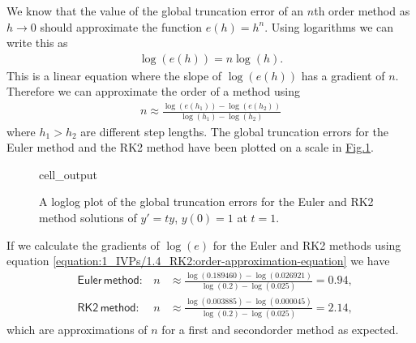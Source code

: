 \documentclass[letterpaper,10pt,english]{jupyterBook}
\begin{document}
\sphinxAtStartPar
We know that the value of the global truncation error of an \(n\)th order method as \(h \to 0\) should approximate the function \(e(h) = h^n\). Using logarithms we can write this as
\begin{equation*}
\begin{split}\log(e(h)) = n \log(h).\end{split}
\end{equation*}
\sphinxAtStartPar
This is a linear equation where the slope of \(\log(e(h))\) has a gradient of \(n\). Therefore we can approximate the order of a method using
\begin{equation}\label{equation:1_IVPs/1.4_RK2:order-approximation-equation}
\begin{split}n \approx \frac{\log(e(h_1)) - \log(e(h_2))}{\log(h_1) - \log(h_2)}\end{split}
\end{equation}
\sphinxAtStartPar
where \(h_1 > h_2\) are different step lengths. The global truncation errors for the Euler method and the RK2 method have been plotted on a  scale in \hyperref[\detokenize{1_IVPs/1.4_RK2:rk2-euler-gte-loglog-plot-figure}]{Fig.\@ \ref{\detokenize{1_IVPs/1.4_RK2:rk2-euler-gte-loglog-plot-figure}}}.

\begin{figure}[htbp]
\centering
\capstart
\begin{sphinxVerbatimOutput}

\begin{sphinxuseclass}{cell_output}
\noindent{}

\end{sphinxuseclass}\end{sphinxVerbatimOutput}
\caption{A loglog plot of the global truncation errors for the Euler and RK2 method solutions of \(y' = t y\), \(y(0) = 1\) at \(t = 1\).}\label{\detokenize{1_IVPs/1.4_RK2:rk2-euler-gte-loglog-plot-figure}}\end{figure}

\sphinxAtStartPar
If we calculate the gradients of \(\log(e)\) for the Euler and RK2 methods using equation \eqref{equation:1_IVPs/1.4_RK2:order-approximation-equation} we have
\begin{align*}
    &\mathsf{Euler\, method}: & n &\approx \frac{\log(0.189460) - \log(0.026921)}{\log(0.2) - \log(0.025)} = 0.94, \\
    &\mathsf{RK2\, method}: & n & \approx \frac{\log(0.003885) - \log(0.000045)}{\log(0.2) - \log(0.025)} = 2.14,
\end{align*}
\sphinxAtStartPar
which are approximations of \(n\) for a first and second\sphinxhyphen{}order method as expected.
\end{document}
